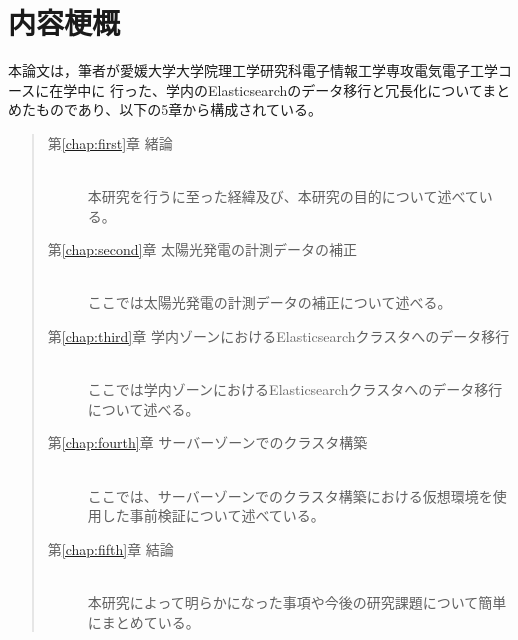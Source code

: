 \chapter*{内容梗概}

本論文は，筆者が愛媛大学大学院理工学研究科電子情報工学専攻電気電子工学コースに在学中に
行った、学内のElasticsearchのデータ移行と冗長化についてまとめたものであり、以下の5章から構成されている。\\

\begin{quote}
  \begin{description}

    \item[第\ref{chap:first}章 緒論]\ \\
          本研究を行うに至った経緯及び、本研究の目的について述べている。
          \vspace{3.0mm}
          
    \item[第\ref{chap:second}章 太陽光発電の計測データの補正]\ \\
          ここでは太陽光発電の計測データの補正について述べる。
          \vspace{3.0mm}
          
    \item[第\ref{chap:third}章 学内ゾーンにおけるElasticsearchクラスタへのデータ移行]\ \\
          ここでは学内ゾーンにおけるElasticsearchクラスタへのデータ移行について述べる。
          \vspace{3.0mm}
          
    \item[第\ref{chap:fourth}章 サーバーゾーンでのクラスタ構築]\ \\
          ここでは、サーバーゾーンでのクラスタ構築における仮想環境を使用した事前検証について述べている。
          \vspace{3.0mm}
          
    \item[第\ref{chap:fifth}章 結論]\ \\
          本研究によって明らかになった事項や今後の研究課題について簡単にまとめている。
          
  \end{description}
\end{quote}
